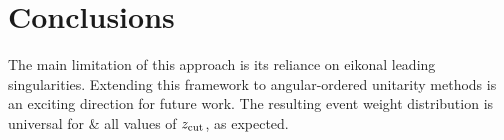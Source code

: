 \section{Conclusions}\label{sec:conclusions}

The main limitation of this approach is its reliance on eikonal leading
singularities. Extending this framework to angular-ordered unitarity
methods is an exciting direction for future work. The resulting event
weight distribution is universal for & all values of $z_{\rm cut}$, as
expected.

